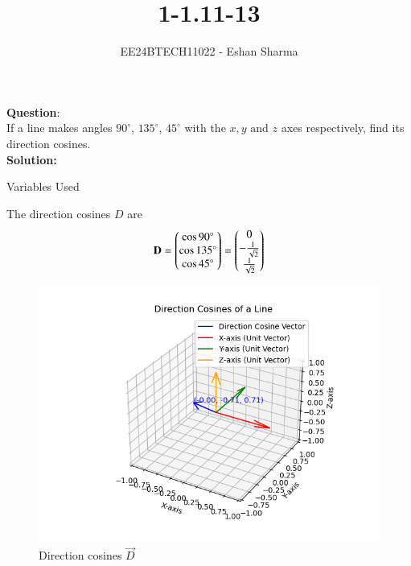 \documentclass[journal]{IEEEtran}
\begin{document}

\vspace{3cm}

\title{1-1.11-13}
\author{EE24BTECH11022 - Eshan Sharma}
{\let\newpage\relax\maketitle}

\renewcommand{\thefigure}{\theenumi}
\renewcommand{\thetable}{\theenumi}
\setlength{\intextsep}{10pt} %


\renewcommand{\thetable}{\theenumi}

\textbf{Question}:\\
If a line makes angles $90^\circ$, $135^\circ$, $45^\circ$ with the $x,y\text{ and }z$ axes respectively, find its direction cosines.
\\
\textbf{Solution:}\\
\begin{table}[h!]    
  \centering
  
  \caption{Variables Used}
  \label{tab0}
\end{table}

The direction cosines $D$ are
\begin{align}
    \mathbf{D} = \begin{pmatrix}\cos{90^\circ}\\\cos{135^\circ}\\\cos{45^\circ}\end{pmatrix} = 
    \begin{pmatrix}0\\-\frac{1}{\sqrt{2}}\\\frac{1}{\sqrt{2}}\end{pmatrix}
\end{align}


\begin{figure}[ht]
    \centering
    \includegraphics[width=\linewidth]{figs/1-1.11-13.png}
    \caption{Direction cosines $\vec{D}$}
    \label{fig:circle_plot}
\end{figure}
  
\end{document}
